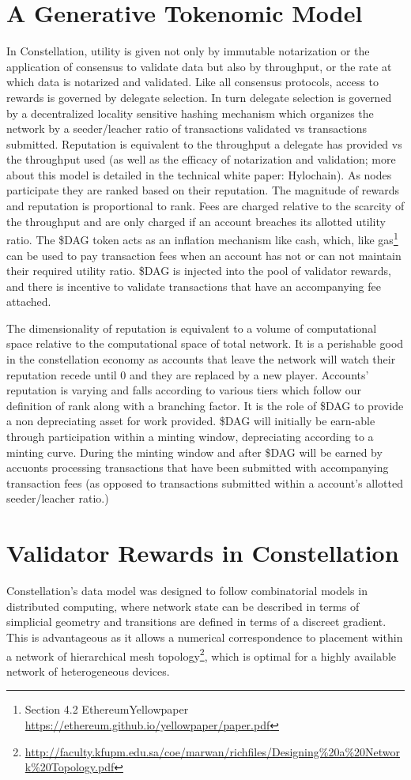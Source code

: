 \documentclass{article}
\begin{document}
\section{A Generative Tokenomic Model}
In Constellation, utility is given not only by immutable notarization or the application of consensus to validate data but also by throughput, or the rate at which data is notarized and validated. Like all consensus protocols, access to rewards is governed by delegate selection. In turn delegate selection is governed by a decentralized locality sensitive hashing mechanism which organizes the network by a seeder/leacher ratio of transactions validated vs transactions submitted. Reputation is equivalent to the throughput a delegate has provided vs the throughput used (as well as the efficacy of notarization and validation; more about this model is detailed in the technical white paper: Hylochain). As nodes participate they are ranked based on their reputation. The magnitude of rewards and reputation is proportional to rank. Fees are charged relative to the scarcity of the throughput and are only charged if an account breaches its allotted utility ratio. The \$DAG token acts as an inflation mechanism like cash, which, like gas\footnote{Section 4.2 EthereumYellowpaper \url{https://ethereum.github.io/yellowpaper/paper.pdf}} can be used to pay transaction fees when an account has not or can not maintain their required utility ratio. \$DAG is injected into the pool of validator rewards, and there is incentive to validate transactions that have an accompanying fee attached. 

The dimensionality of reputation is equivalent to a volume of computational space relative to the computational space of total network. It is a perishable good in the constellation economy as accounts that leave the network will watch their reputation recede until 0 and they are replaced by a new player. Accounts' reputation is varying and falls according to various tiers which follow our definition of rank along with a branching factor. It is the role of \$DAG to provide a non depreciating asset for work provided. \$DAG will initially be earn-able through participation within a minting window, depreciating according to a minting curve. During the minting window and after  \$DAG will be earned by accuonts processing transactions that have been submitted with accompanying transaction fees (as opposed to transactions submitted within a account's allotted seeder/leacher ratio.)

\section{Validator Rewards in Constellation}
Constellation's data model was designed to follow combinatorial models in distributed computing, where network state can be described in terms of simplicial geometry and transitions are defined in terms of a discreet gradient. This is advantageous as it allows a numerical correspondence to placement within a network of hierarchical mesh topology\footnote{\url{http://faculty.kfupm.edu.sa/coe/marwan/richfiles/Designing\%20a\%20Network\%20Topology.pdf}}, which is optimal for a highly available network of heterogeneous devices.
\end{document}
